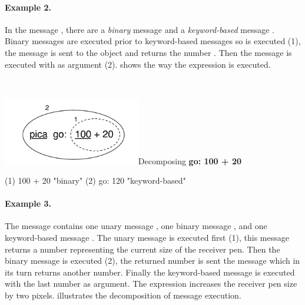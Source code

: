 \paragraph{Example 2.} In the message , there are a \emph{binary} message  and a \emph{keyword-based} message . Binary messages are executed prior to keyword-based messages so  is executed (1), the message  is sent to the object  and returns the number . Then the message  is executed with  as argument (2).
 shows the way the expression is executed. 

\

\begin{decompfigwithsize}[0.65]{\includegraphics[width=6cm]{ukeyBin}}{Decomposing }\label{scr:decGo}
      \textbf{\caro go: 100 + 20}
      
(1)                  100 + 20                        "binary"
(2)  \caro go: 120                                 "keyword-based"
\end{decompfigwithsize}




\paragraph{Example 3.}
The message  contains one unary message , one binary message \ct{+},  and one keyword-based message .
The unary message  is executed first (1), this message returns a number representing the current size of the receiver pen. Then the binary message is executed (2), the returned number is sent the message  which in its turn returns another number. Finally the keyword-based message 
 is executed with the last number as argument. The expression increases the receiver pen size by two pixels.  illustrates the decomposition of message execution.


\

